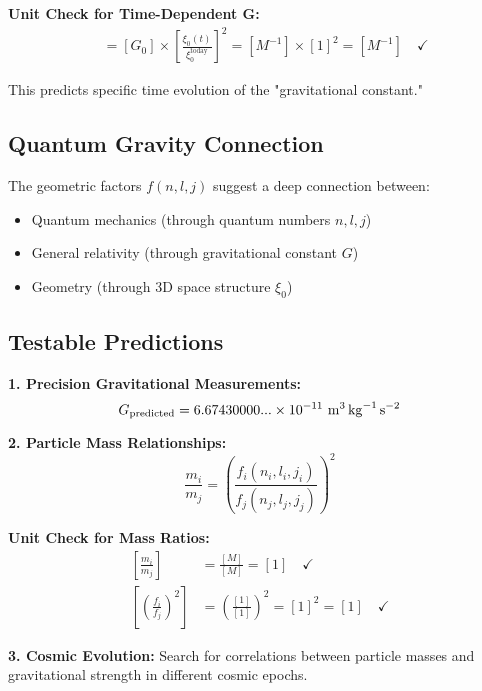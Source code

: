 \documentclass[12pt,a4paper]{article}
\newcommand{\xifunc}{f(n,l,j)}
\theoremstyle{definition}
\begin{document}
	 
		\textbf{Unit Check for Time-Dependent G:}
		\begin{align}
			[G(t)] &= [G_0] \times \left[\frac{\xi_0(t)}{\xi_0^{\text{today}}}\right]^2 = [M^{-1}] \times [1]^2 = [M^{-1}] \quad \checkmark
		\end{align}
	 
	
	This predicts specific time evolution of the "gravitational constant."
	
	\subsection{Quantum Gravity Connection}
	
	The geometric factors $\xifunc$ suggest a deep connection between:
	\begin{itemize}
		\item Quantum mechanics (through quantum numbers $n,l,j$)
		\item General relativity (through gravitational constant $G$)
		\item Geometry (through 3D space structure $\xi_0$)
	\end{itemize}
	
	\subsection{Testable Predictions}
	
	\textbf{1. Precision Gravitational Measurements:}
	\begin{equation}
		G_{\text{predicted}} = 6.67430000... \times 10^{-11} \text{ \si{\metre\cubed\per\kilogram\per\second\squared}}
	\end{equation}
	
	\textbf{2. Particle Mass Relationships:}
	\begin{equation}
		\frac{m_i}{m_j} = \left(\frac{f_i(n_i,l_i,j_i)}{f_j(n_j,l_j,j_j)}\right)^2
	\end{equation}
	
	 
		\textbf{Unit Check for Mass Ratios:}
		\begin{align}
			\left[\frac{m_i}{m_j}\right] &= \frac{[M]}{[M]} = [1] \quad \checkmark \\
			\left[\left(\frac{f_i}{f_j}\right)^2\right] &= \left(\frac{[1]}{[1]}\right)^2 = [1]^2 = [1] \quad \checkmark
		\end{align}
	 
	
	\textbf{3. Cosmic Evolution:}
	Search for correlations between particle masses and gravitational strength in different cosmic epochs.
	
\end{document}

